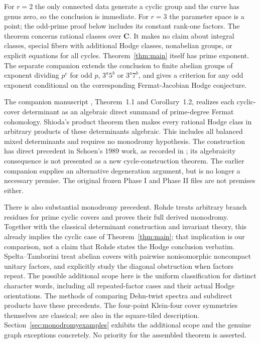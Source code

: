\documentclass[11pt]{article}
\theoremstyle{definition}
\newcommand{\C}{\mathbf C}
\begin{document}
For $r=2$ the only connected data generate a cyclic group and the curve has
genus zero, so the conclusion is immediate. For $r=3$ the parameter space is
a point; the odd-prime proof below includes its constant rank-one factors.
The theorem concerns rational classes over $\C$. It makes no claim about
integral classes, special fibers with additional Hodge classes, nonabelian
groups, or explicit equations for all cycles. Theorem~\ref{thm:main} itself
has prime exponent. The separate companion \cite[Section 7]{Extensions}
extends the conclusion to finite abelian groups of exponent dividing
$p^e$ for odd $p$, $3^a5^b$ or $3^a7^b$, and gives a criterion for any odd
exponent conditional on the corresponding Fermat-Jacobian Hodge conjecture.

The companion manuscript \cite{Fermat}, Theorem~1.1 and Corollary~1.2,
realizes each cyclic-cover determinant as an algebraic direct summand of
prime-degree Fermat cohomology. Shioda's product theorem \cite{Shioda}
then makes every rational Hodge class in arbitrary products of these
determinants algebraic. This includes all balanced mixed determinants and
requires no monodromy hypothesis. The construction has direct precedent
in Schoen's 1989 work, as recorded in \cite{Fermat}; its algebraicity
consequence is not presented as a new cycle-construction theorem.
The earlier companion \cite{Fusion} supplies an alternative degeneration
argument, but is no longer a necessary premise. The original frozen Phase I
and Phase II files are not premises either.

There is also substantial monodromy precedent. Rohde
\cite[Construction 3.2.1, Theorem 5.3.7]{Rohde} treats arbitrary branch
residues for prime cyclic covers and proves their full derived monodromy.
Together with the classical determinant construction and invariant theory,
this already implies the cyclic case of Theorem~\ref{thm:main}; that
implication is our comparison, not a claim that Rohde states the Hodge
conclusion verbatim. Spelta--Tamborini \cite[Theorem 1.7]{ST} treat abelian
covers with pairwise nonisomorphic noncompact unitary factors, and explicitly
study the diagonal obstruction when factors repeat. The possible additional
scope here is the uniform classification for distinct character words,
including all repeated-factor cases and their actual Hodge orientations.
The methods of comparing Dehn-twist spectra and subdirect products have
these precedents. The four-point Klein-four cover symmetries themselves
are classical; see also \cite[Section 2.6, Lemma 16]{FMZ} in the square-tiled
description. Section~\ref{sec:monodromyexamples} exhibits the additional
scope and the genuine graph exceptions concretely. No priority for the
assembled theorem is asserted.
\end{document}
